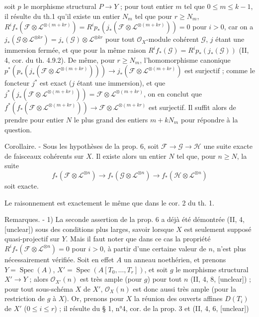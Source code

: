 soit $p$ le morphisme structural $P \to Y$ ; pour tout entier $m$ tel que $0 \le m \le k-1$, il résulte du th.1 qu'il existe un entier $N_m$ tel que pour $r \ge N_m$, $R^i f_* (\mathcal{F} \otimes \mathcal{L}^{\otimes(m+kr)}) = R^i p_* (j_* (\mathcal{F} \otimes \mathcal{L}^{\otimes(m+kr)})) = 0$ pour $i > 0$, car on a $j_* (\mathcal{G} \otimes \mathcal{L}^{\otimes kr}) = j_*(\mathcal{G}) \otimes \mathcal{L}^{\otimes kr}$ pour tout $\mathcal{O}_X$-module cohérent $\mathcal{G}$, $j$ étant une immersion fermée, et que pour la même raison $R^i f_* (\mathcal{G}) = R^i p_* (j_* (\mathcal{G}))$ (II, 4, cor. du th. 4.9.2). De même, pour $r \ge N_m$, l'homomorphisme canonique $p^* (p_* (j_* (\mathcal{F} \otimes \mathcal{L}^{\otimes(m+kr)}))) \to j_* (\mathcal{F} \otimes \mathcal{L}^{\otimes(m+kr)})$ est surjectif ; comme le foncteur $j^*$ est exact ($j$ étant une immersion), et que $j^* (j_* (\mathcal{F} \otimes \mathcal{L}^{\otimes(m+kr)})) = \mathcal{F} \otimes \mathcal{L}^{\otimes(m+kr)}$, on en conclut que $f^* (f_* (\mathcal{F} \otimes \mathcal{L}^{\otimes(m+kr)})) \to \mathcal{F} \otimes \mathcal{L}^{\otimes(m+kr)}$ est surjectif. Il suffit alors de prendre pour entier $N$ le plus grand des entiers $m+kN_m$ pour répondre à la question.

Corollaire. - Sous les hypothèses de la prop. 6, soit $\mathcal{F} \to \mathcal{G} \to \mathcal{H}$ une suite exacte de faisceaux cohérents sur $X$. Il existe alors un entier $N$ tel que, pour $n \ge N$, la suite
$$f_* (\mathcal{F} \otimes \mathcal{L}^{\otimes n}) \to f_* (\mathcal{G} \otimes \mathcal{L}^{\otimes n}) \to f_* (\mathcal{H} \otimes \mathcal{L}^{\otimes n})$$
soit exacte.

Le raisonnement est exactement le même que dans le cor. 2 du th. 1.

Remarques. - 1) La seconde assertion de la prop. 6 a déjà été démontrée (II, 4, [unclear]) sous des conditions plus larges, savoir lorsque $X$ est seulement supposé quasi-projectif sur $Y$. Mais il faut noter que dans ce cas la propriété $R^i f_* (\mathcal{F} \otimes \mathcal{L}^{\otimes n}) = 0$ pour $i > 0$, à partir d'une certaine valeur de $n$, n'est plus nécessairement vérifiée. Soit en effet $A$ un anneau noethérien, et prenons $Y = \operatorname{Spec}(A)$, $X' = \operatorname{Spec}(A[T_0, \dots, T_r])$, et soit $g$ le morphisme structural $X' \to Y$ ; alors $\mathcal{O}_{X'}(n)$ est très ample (pour $g$) pour tout $n$ (II, 4, 8, [unclear]) ; pour tout sous-schéma $X$ de $X'$, $\mathcal{O}_X(n)$ est donc aussi très ample (pour la restriction de $g$ à $X$). Or, prenons pour $X$ la réunion des ouverts affines $D(T_i)$ de $X'$ ($0 \le i \le r$) ; il résulte du § 1, n°4, cor. de la prop. 3 et (II, 4, 6, [unclear])

